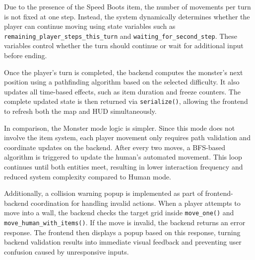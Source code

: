 Due to the presence of the Speed Boots item, the number of movements per turn is not fixed at one step. Instead, the system dynamically determines whether the player can continue moving using state variables such as \texttt{remaining\_player\_steps\_this\_turn} and \texttt{waiting\_for\_second\_step}. These variables control whether the turn should continue or wait for additional input before ending.

Once the player's turn is completed, the backend computes the monster's next position using a pathfinding algorithm based on the selected difficulty. It also updates all time-based effects, such as item duration and freeze counters. The complete updated state is then returned via \texttt{serialize()}, allowing the frontend to refresh both the map and HUD simultaneously.

In comparison, the Monster mode logic is simpler. Since this mode does not involve the item system, each player movement only requires path validation and coordinate updates on the backend. After every two moves, a BFS-based algorithm is triggered to update the human's automated movement. This loop continues until both entities meet, resulting in lower interaction frequency and reduced system complexity compared to Human mode.

Additionally, a collision warning popup is implemented as part of frontend-backend coordination for handling invalid actions. When a player attempts to move into a wall, the backend checks the target grid inside \texttt{move\_one()} and \texttt{move\_human\_with\_items()}. If the move is invalid, the backend returns an error response. The frontend then displays a popup based on this response, turning backend validation results into immediate visual feedback and preventing user confusion caused by unresponsive inputs.